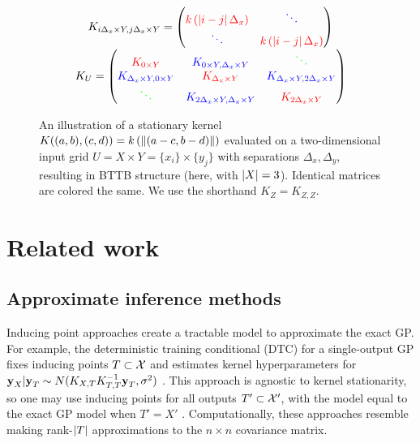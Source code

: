 \documentclass[twoside]{article}
\begin{document}
\begin{figure}[!ht]
\begin{center}
$$
\begin{array}{c}
K_{i\Delta_x\times Y,j\Delta_x\times Y}=\begin{pmatrix} {\color{red} k \left({\left|i-j\right|\Delta_x}\right)  }&{\color{blue}\ddots} \\
{\color{blue}\ddots} &{ \color{red} k\left({\left|i-j\right|\Delta_x}\right)}  \end{pmatrix} \\
K_U=\begin{pmatrix} 
 {\color{red} K_{0\times Y} } & {\color{blue} K_{0\times Y,\Delta_x\times Y}}& {\color{green}\ddots }\\
{\color{blue} K_{\Delta_x\times Y, 0\times Y}} & {\color{red} K_{\Delta_x\times Y}} & {\color{blue} K_{\Delta_x\times Y, 2\Delta_x\times Y}} \\
{\color{green} \ddots } & {\color{blue}  K_{2\Delta_x\times Y, \Delta_x\times Y}} & {\color{red} K_{2\Delta_x\times Y}}
 \end{pmatrix}
\end{array}
$$
\end{center}
\caption{An illustration of a stationary kernel $K((a, b), (c, d))=k\left({\left\| (a-c, b-d) \right\|}\right)$ evaluated on a two-dimensional input grid $U=X\times Y =\{x_i\}\times \{y_j\}$ with separations $\Delta_x,\Delta_y$, resulting in BTTB structure (here, with $\left\vert{X}\right\vert=3$). Identical matrices are colored the same. We use the shorthand $K_Z=K_{Z,Z}$.}
\label{fig:bttb}
\end{figure}

\section{Related work}
\label{sec:related-work}
\subsection{Approximate inference methods}

Inducing point approaches create a tractable model to approximate the exact GP. For example, the deterministic training conditional (DTC) for a single-output GP fixes inducing points $T\subset\mathcal{X}$ and estimates kernel hyperparameters for $\textbf{y}_{X}|\textbf{y}_{T}\sim N(K_{X,T}K_{T,T}^{-1}\textbf{y}_T,\sigma^2)$ \citep{quinonero2005unifying}. This approach is agnostic to kernel stationarity, so one may use inducing points for all outputs $T'\subset \mathcal{X}'$, with the model equal to the exact GP model when $T'={X'}$ \citep{alvarez2010efficient}. Computationally, these approaches resemble making rank-$\left\vert{T}\right\vert$ approximations to the $n\times n$ covariance matrix.
\end{document}
